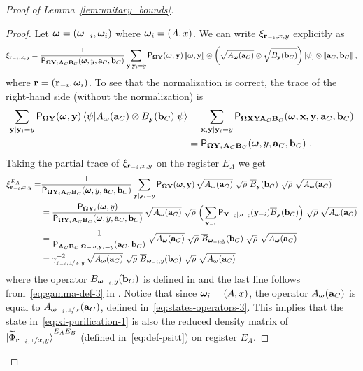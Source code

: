 \begin{proof}[Proof of Lemma~\ref{lem:unitary_bounds}]
\begin{proof}
Let ${\boldsymbol{\omega}} = ({\boldsymbol{\omega}}_{-i},{\boldsymbol{\omega}}_i)$ where ${\boldsymbol{\omega}}_i = (A,x)$. We can write $\xi_{\mathbf{r}_{-i} , x,y}$ explicitly as
\begin{align*}
	\xi_{\mathbf{r}_{-i} , x,y} = \frac{1}{\mathsf{P}_{{\boldsymbol{\Omega}} \mathbf{Y}_i \mathbf{A}_C \mathbf{B}_C}({\boldsymbol{\omega}},y,\mathbf{a}_C,\mathbf{b}_C)} \sum_{\mathbf{y} | \mathbf{y}_i = y} \mathsf{P}_{{\boldsymbol{\Omega}} \mathbf{Y}}({\boldsymbol{\omega}}, \mathbf{y}) \, \llbracket {\boldsymbol{\omega}}, \mathbf{y} \rrbracket \otimes \left (\sqrt{A_{{\boldsymbol{\omega}}}(\mathbf{a}_C)} \otimes \sqrt{B_{\mathbf{y}}(\mathbf{b}_C)} \right ) \left [\psi \right ] \otimes \llbracket \mathbf{a}_C,\mathbf{b}_C \rrbracket\;,
\end{align*}
where $\mathbf{r} = (\mathbf{r}_{-i},{\boldsymbol{\omega}}_i)$. To see that the normalization is correct, the trace of the right-hand side (without the normalization) is
\begin{align*}
	\sum_{\mathbf{y} | \mathbf{y}_i = y} \mathsf{P}_{{\boldsymbol{\Omega}} \mathbf{Y}}({\boldsymbol{\omega}}, \mathbf{y}) \, {\langle\psi|} A_{\boldsymbol{\omega}}(\mathbf{a}_C) \otimes B_{\mathbf{y}}(\mathbf{b}_C) {|\psi\rangle} &= \sum_{\mathbf{x},\mathbf{y} | \mathbf{y}_i = y} \mathsf{P}_{{\boldsymbol{\Omega}} \mathbf{X} \mathbf{Y} \mathbf{A}_C \mathbf{B}_C}({\boldsymbol{\omega}}, \mathbf{x}, \mathbf{y}, \mathbf{a}_C, \mathbf{b}_C) \\
	&= \mathsf{P}_{{\boldsymbol{\Omega}} \mathbf{Y}_i \mathbf{A}_C \mathbf{B}_C}({\boldsymbol{\omega}},y,\mathbf{a}_C,\mathbf{b}_C)~.
\end{align*}
Taking the partial trace of $\xi_{\mathbf{r}_{-i} , x,y}$ on the register $E_A$ we get
\begin{align}
\xi_\ssxy^{E_A} = &\frac{1}{\P_{\bOmega \bY_i \bA_C \bB_C}(\bomega,y,\ba_C,\bb_C)} \sum_{\by | \by_i = y} \P_{\bOmega \bY}(\bomega, \by) \, \sqrt{A_{\bomega}(\ba_C)} \,\, \sqrt{\rho} \,\, \overline{B}_\by(\bb_C) \,\, \sqrt{\rho} \,\, \sqrt{A_\bomega(\ba_C)}  \notag \\
&= \frac{\P_{\bOmega \bY_i}(\bomega, y)}{\P_{\bOmega \bY_i \bA_C \bB_C}(\bomega,y,\ba_C,\bb_C)} \, \sqrt{A_{\bomega}(\ba_C)} \,\, \sqrt{\rho} \,\, \Big ( \sum_{\by_\mi } \P_{\bY_\mi | \bomega_\mi}(\by_\mi) \overline{B}_\by(\bb_C) \Big) \,\, \sqrt{\rho} \,\, \sqrt{A_\bomega(\ba_C)} \notag \\
&= \frac{1}{\P_{\bA_C \bB_C | \bOmega = \bomega, \by_i = y}(\ba_C,\bb_C)} \, \sqrt{A_{\bomega}(\ba_C)} \,\, \sqrt{\rho} \,\,  \overline{B}_{\bomega_\mi, y} (\bb_C) \,\, \sqrt{\rho} \,\, \sqrt{A_\bomega(\ba_C)} \notag \\
&= \gamma_\sspxy^{-2} \, \sqrt{A_{\bomega}(\ba_C)} \,\, \sqrt{\rho} \,\,  \overline{B}_{\bomega_\mi, y} (\bb_C) \,\, \sqrt{\rho} \,\, \sqrt{A_\bomega(\ba_C)}
\label{eq:xi-purification-1}
\end{align}
where the operator $B_{{\boldsymbol{\omega}}_{-i}, y} (\mathbf{b}_C)$ is defined in  and the last line follows from~\eqref{eq:gamma-def-3} in . Notice that since ${\boldsymbol{\omega}}_i = (A,x)$, the operator $A_{\boldsymbol{\omega}}(\mathbf{a}_C)$ is equal to $A_{\bomega_\mi,\dummyx}(\ba_C)$, defined in~\eqref{eq:states-operators-3}. This implies that the state in~\eqref{eq:xi-purification-1} is also the reduced density matrix of $\ket{\wt{\Phi}_\sspxy}^{E_A E_B}$ (defined in~\eqref{eq:def-psitt}) on register $E_A$. 


\end{proof}
\end{proof}
